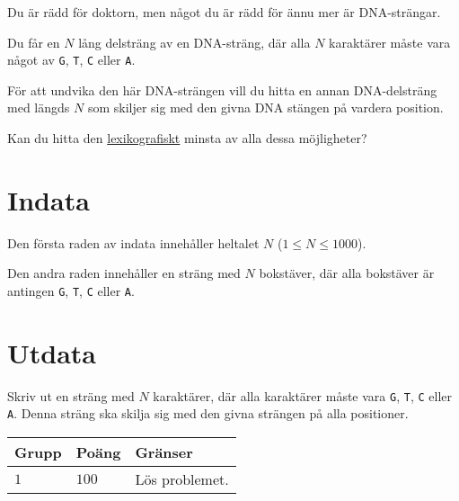 \noindent
Du är rädd för doktorn, men något du är rädd för ännu mer är DNA-strängar.

Du får en $N$ lång delsträng av en DNA-sträng, där alla $N$ karaktärer måste vara något av \texttt{G}, \texttt{T}, \texttt{C} eller \texttt{A}.

För att undvika den här DNA-strängen vill du hitta en annan DNA-delsträng med längds $N$ som skiljer sig med den givna DNA stängen på vardera position.

Kan du hitta den \href{https://en.wikipedia.org/wiki/Lexicographic_order}{lexikografiskt} minsta av alla dessa möjligheter? 

\section*{Indata}
\noindent
Den första raden av indata innehåller heltalet $N$ ($1 \leq N \leq 1000$).

Den andra raden innehåller en sträng med $N$ bokstäver, där alla bokstäver är antingen \texttt{G}, \texttt{T}, \texttt{C} eller \texttt{A}.

\section*{Utdata}
\noindent
Skriv ut en sträng med $N$ karaktärer, där alla karaktärer måste vara \texttt{G}, \texttt{T}, \texttt{C} eller \texttt{A}. 
Denna sträng ska skilja sig med den givna strängen på alla positioner.

\noindent
\begin{tabular}{| l | l | l |}
  \hline
  \textbf{Grupp} & \textbf{Poäng} & \textbf{Gränser} \\ \hline
  $1$   & $100$        & Lös problemet. \\ \hline
\end{tabular}
